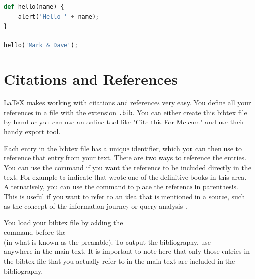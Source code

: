 \documentclass[a4paper,10pt]{ehu_webdev_report}
\begin{document}
\begin{lstlisting}[language=python]
def hello(name) {
    alert('Hello ' + name);
}

hello('Mark & Dave');
\end{lstlisting}




\section{Citations and References}

\LaTeX{} makes working with citations and references very easy. You define all your references in a file with the extension \texttt{.bib}. You can either create this bibtex file by hand or you can use an online tool like "Cite this For Me.com" \citep{ctfm_2015} and use their handy export tool.

Each entry in the bibtex file has a unique identifier, which you can then use to reference that entry from your text. There are two ways to reference the entries. You can use the  command if you want the reference to be included directly in the text. For example to indicate that \citet{baeza1999} wrote one of the definitive books in this area. Alternatively, you can use the  command to place the reference in parenthesis. This is useful if you want to refer to an idea that is mentioned in a source, such as the concept of the information journey \citep{bates1989} or query analysis \citep{belkin2003}.

You load your bibtex file by adding the \\  command before the \\  (in what is known as the preamble). To output the bibliography, use \\  anywhere in the main text. It is important to note here that only those entries in the bibtex file that you actually refer to in the main text are included in the bibliography.

\newpage

\printbibliography{}
\end{document}

